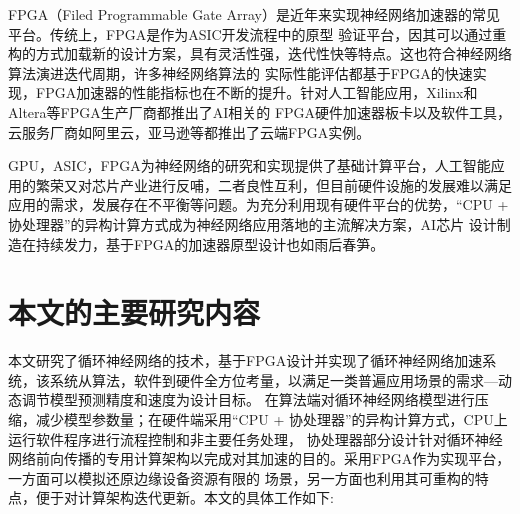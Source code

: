 FPGA（Filed Programmable Gate Array）是近年来实现神经网络加速器的常见平台。传统上，FPGA是作为ASIC开发流程中的原型
验证平台，因其可以通过重构的方式加载新的设计方案，具有灵活性强，迭代性快等特点。这也符合神经网络算法演进迭代周期，许多神经网络算法的
实际性能评估都基于FPGA的快速实现，FPGA加速器的性能指标也在不断的提升。针对人工智能应用，Xilinx和Altera等FPGA生产厂商都推出了AI相关的
FPGA硬件加速器板卡以及软件工具，云服务厂商如阿里云，亚马逊等都推出了云端FPGA实例。

GPU，ASIC，FPGA为神经网络的研究和实现提供了基础计算平台，人工智能应用的繁荣又对芯片产业进行反哺，二者良性互利，但目前硬件设施的发展难以满足
应用的需求，发展存在不平衡等问题。为充分利用现有硬件平台的优势，“CPU + 协处理器”的异构计算方式成为神经网络应用落地的主流解决方案，AI芯片
设计制造在持续发力，基于FPGA的加速器原型设计也如雨后春笋。
\section{本文的主要研究内容}
本文研究了循环神经网络的技术，基于FPGA设计并实现了循环神经网络加速系统，该系统从算法，软件到硬件全方位考量，以满足一类普遍应用场景的需求---动态调节模型预测精度和速度为设计目标。
在算法端对循环神经网络模型进行压缩，减少模型参数量；在硬件端采用“CPU + 协处理器”的异构计算方式，CPU上运行软件程序进行流程控制和非主要任务处理，
协处理器部分设计针对循环神经网络前向传播的专用计算架构以完成对其加速的目的。采用FPGA作为实现平台，一方面可以模拟还原边缘设备资源有限的
场景，另一方面也利用其可重构的特点，便于对计算架构迭代更新。本文的具体工作如下:

